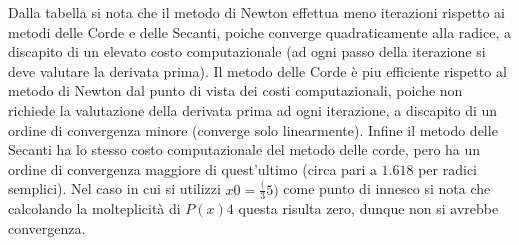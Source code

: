 Dalla tabella si nota che il metodo di Newton effettua meno iterazioni
rispetto ai metodi delle Corde e delle Secanti, poiche converge quadraticamente
alla radice, a discapito di un elevato costo computazionale (ad ogni passo 
della iterazione si deve valutare la derivata prima).
Il metodo delle Corde è piu efficiente rispetto al metodo di Newton 
dal punto di vista dei costi computazionali, poiche non richiede la valutazione della 
derivata prima ad ogni iterazione, a discapito di un ordine di convergenza minore
(converge solo linearmente).
Infine il metodo delle Secanti ha lo stesso costo computazionale del metodo delle corde,
pero ha un ordine di convergenza maggiore di quest'ultimo (circa pari a $1.618$ per radici semplici).
Nel caso in cui si utilizzi $x0=\frac({3}{5})$ come punto di innesco si nota che calcolando la molteplicità di $P(x)4$ questa risulta zero, dunque non si avrebbe convergenza.\\\\